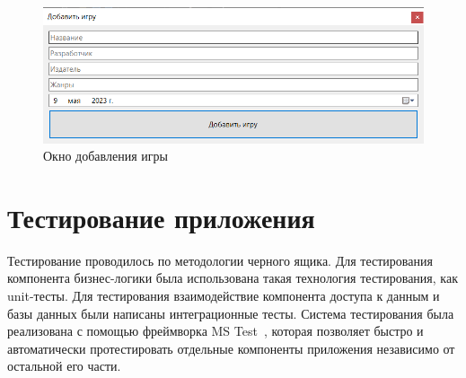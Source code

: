 \begin{figure}[H]
	\begin{center}
		\includegraphics[scale=0.8]{../imgs/interface/AddGame.png}
	\end{center}
	\captionsetup{justification=centering}
	\caption{Окно добавления игры}
	\label{img:addGame}
\end{figure}

\section{Тестирование приложения}

Тестирование проводилось по методологии черного ящика. Для тестирования компонента бизнес-логики была использована такая технология тестирования, как unit-тесты. Для тестирования взаимодействие компонента доступа к данным и базы данных были написаны интеграционные тесты. Система тестирования была реализована с помощью фреймворка MS Test~\cite{mstest}, которая позволяет быстро и автоматически протестировать отдельные компоненты приложения независимо от остальной его части. 